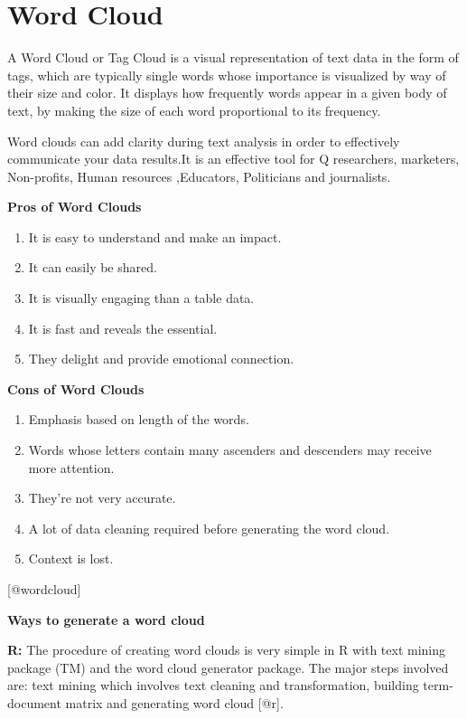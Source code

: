 \documentclass[]{book}
\providecommand{\tightlist}{%
  \setlength{\itemsep}{0pt}\setlength{\parskip}{0pt}}
\theoremstyle{definition}
\theoremstyle{definition}
\theoremstyle{definition}
\theoremstyle{remark}
\begin{document}
\section{Word Cloud}\label{word-cloud}

A Word Cloud or Tag Cloud is a visual representation of text data in the
form of tags, which are typically single words whose importance is
visualized by way of their size and color. It displays how frequently
words appear in a given body of text, by making the size of each word
proportional to its frequency.

Word clouds can add clarity during text analysis in order to effectively
communicate your data results.It is an effective tool for Q researchers,
marketers, Non-profits, Human resources ,Educators, Politicians and
journalists.

\textbf{Pros of Word Clouds}

\begin{enumerate}
\def\labelenumi{\arabic{enumi}.}
\tightlist
\item
  It is easy to understand and make an impact.
\item
  It can easily be shared.
\item
  It is visually engaging than a table data.
\item
  It is fast and reveals the essential.
\item
  They delight and provide emotional connection.
\end{enumerate}

\textbf{Cons of Word Clouds}

\begin{enumerate}
\def\labelenumi{\arabic{enumi}.}
\tightlist
\item
  Emphasis based on length of the words.
\item
  Words whose letters contain many ascenders and descenders may receive
  more attention.
\item
  They're not very accurate.
\item
  A lot of data cleaning required before generating the word cloud.
\item
  Context is lost.
\end{enumerate}

{[}@wordcloud{]}

\textbf{Ways to generate a word cloud}

\textbf{R:} The procedure of creating word clouds is very simple in R
with text mining package (TM) and the word cloud generator package. The
major steps involved are: text mining which involves text cleaning and
transformation, building term-document matrix and generating word cloud
{[}@r{]}.
\end{document}
